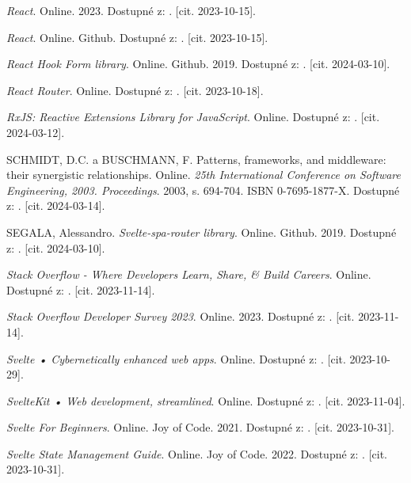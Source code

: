 \begin{thebibliography}{99}
\emph{React}. Online. 2023. Dostupné z: . [cit. 2023-10-15].

\emph{React}. Online. Github. Dostupné z: . [cit. 2023-10-15].

\emph{React Hook Form library}. Online. Github. 2019. Dostupné z: . [cit. 2024-03-10].

\emph{React Router}. Online. Dostupné z: . [cit. 2023-10-18].

\emph{RxJS: Reactive Extensions Library for JavaScript}. Online. Dostupné z: . [cit. 2024-03-12].

\textsc{SCHMIDT}, D.C. a \textsc{BUSCHMANN}, F. Patterns, frameworks, and middleware: their synergistic relationships. Online. \emph{25th International Conference on Software Engineering, 2003. Proceedings}. 2003, s. 694-704. ISBN 0-7695-1877-X. Dostupné z: . [cit. 2024-03-14].

\textsc{SEGALA}, Alessandro. \emph{Svelte-spa-router library}. Online. Github. 2019. Dostupné z: . [cit. 2024-03-10].

\emph{Stack Overflow - Where Developers Learn, Share, \& Build Careers}. Online. Dostupné z: . [cit. 2023-11-14].

\emph{Stack Overflow Developer Survey 2023}. Online. 2023. Dostupné z: . [cit. 2023-11-14].

\emph{Svelte • Cybernetically enhanced web apps}. Online. Dostupné z: . [cit. 2023-10-29].

\emph{SvelteKit • Web development, streamlined}. Online. Dostupné z: . [cit. 2023-11-04].

\emph{Svelte For Beginners}. Online. Joy of Code. 2021. Dostupné z: . [cit. 2023-10-31].

\emph{Svelte State Management Guide}. Online. Joy of Code. 2022. Dostupné z: . [cit. 2023-10-31].


\end{thebibliography}

